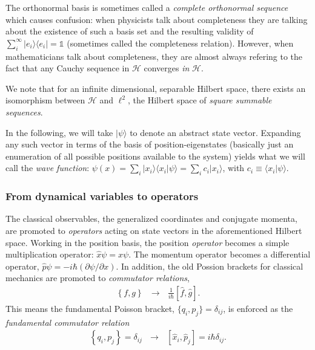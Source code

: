 \documentclass[../../master.tex]{subfiles}
\begin{document}
The orthonormal basis is sometimes called a \emph{complete orthonormal sequence} \cite{rynne} which causes confusion: when physicists talk about completeness they are talking about the existence of such a basis set and the resulting validity of $\sum_i^\infty |e_i\rangle\langle e_i|=\mathds{1}$ (sometimes called the completeness relation). However, when mathematicians talk about completeness, they are almost always refering to the fact that any Cauchy sequence in $\mathcal{H}$ converges \emph{in} $\mathcal{H}$.

We note that for an infinite dimensional, separable Hilbert space, there exists an isomorphism between $\mathcal H$ and $\ell^2$, the Hilbert space of \emph{square summable sequences}. 

In the following, we will take $|\psi\rangle$ to denote an abstract state vector. Expanding any such vector in terms of  the basis of position-eigenstates (basically just an enumeration of all possible positions available to the system) yields what we will call the \emph{wave function}: $\psi(x)=\sum_i|x_i\rangle  \langle x_i | \psi \rangle = \sum_i c_i |x_i\rangle$, with $c_i\equiv \langle x_i|\psi\rangle$.

\subsubsection{From dynamical variables to operators}
The classical observables, the generalized coordinates and conjugate momenta, are promoted to \emph{operators} acting on state vectors in the aforementioned Hilbert space. Working in the position basis, the position \emph{operator} becomes a simple multiplication operator: $\hat x \psi = x\psi$. The momentum operator becomes a differential operator, $\hat p \psi= -i\hbar (\partial \psi / \partial  x)$. In addition, the old Possion brackets for classical mechanics are promoted to \emph{commutator relations},
\begin{align}
\left\{ f, g \right\} \ \ \  \rightarrow \ \ \  \frac{1}{i \hbar }\left[ \hat f, \hat g \right].
\end{align}
This means the fundamental Poisson bracket, $\{q_i,p_j\}=\delta_{ij}$, is enforced as the \emph{fundamental commutator relation}
\begin{align}
\left\{ q_i, p_j \right\}=\delta_{ij} \ \ \ \rightarrow \ \ \ \left[ \hat x_i, \hat p_j \right] = i\hbar \delta_{ij}.
\end{align}
\end{document}
